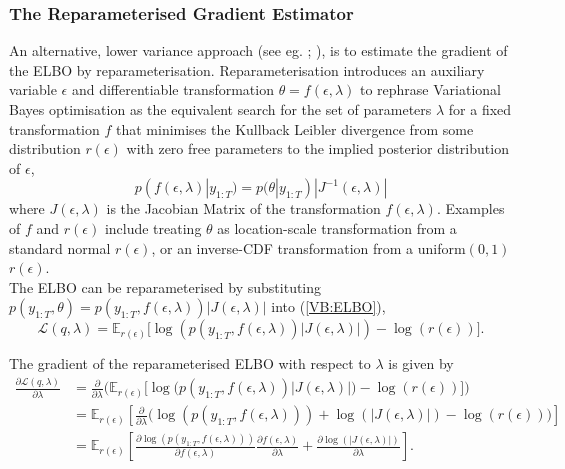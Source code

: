 \documentclass[
12pt, %
onehalfspacing, %
nohyperref, %
headsepline, %
chapterinoneline, %
]{MastersDoctoralThesis} %
\begin{document}
\subsubsection{The Reparameterised Gradient Estimator}
\label{subsubsec:SVBRP}
An alternative, lower variance approach (see eg. \cite{Rezende2014}; \cite{Ruiz2016}), is to estimate the gradient of the ELBO by reparameterisation. Reparameterisation introduces an auxiliary variable $\epsilon$ and differentiable transformation $\theta = f(\epsilon, \lambda)$ to rephrase Variational Bayes optimisation as the equivalent search for the set of parameters $\lambda$ for a fixed transformation $f$ that minimises the Kullback Leibler divergence from some distribution $r(\epsilon)$ with zero free parameters to the implied posterior distribution of $\epsilon$,
\begin{equation}
\label{SVB:rpDist}
p(f(\epsilon, \lambda) | y_{1:T}) = p(\theta | y_{1:T}) |J^{-1}(\epsilon, \lambda)|
\end{equation}
where $J(\epsilon, \lambda)$ is the Jacobian Matrix of the transformation $f(\epsilon, \lambda)$. Examples of $f$ and $r(\epsilon)$ include treating $\theta$ as location-scale transformation from a standard normal $r(\epsilon)$, or an inverse-CDF transformation from a uniform$(0, 1)$ $r(\epsilon)$. 
\\

The ELBO can be reparameterised by substituting $p(y_{1:T}, \theta) = p(y_{1:T}, f(\epsilon, \lambda))|J(\epsilon, \lambda)|$ into (\ref{VB:ELBO}),
\begin{equation}
\label{SVB:rpELBO}
\mathcal{L}(q, \lambda) = \mathbb{E}_{r(\epsilon)} \bigg[\log(p(y_{1:T}, f(\epsilon,\lambda))|J(\epsilon, \lambda)|) - \log(r(\epsilon))\bigg].
\end{equation}

The gradient of the reparameterised ELBO with respect to $\lambda$ is given by 
\begin{align}
\label{SVB:rpELBODeriv}
\frac{\partial\mathcal{L}(q, \lambda)}{\partial \lambda} &= \frac{\partial}{\partial \lambda} \bigg( \mathbb{E}_{r(\epsilon)} \bigg[\log\big(p(y_{1:T}, f(\epsilon,\lambda))|J(\epsilon, \lambda)|\big) - \log(r(\epsilon))\bigg] \bigg) \nonumber \\
&= \mathbb{E}_{r(\epsilon)} \left[ \frac{\partial}{\partial \lambda} \bigg(\log(p(y_{1:T}, f(\epsilon,\lambda))) + \log(|J(\epsilon, \lambda)|) - \log(r(\epsilon)) \bigg)\right] \nonumber \\
&= \mathbb{E}_{r(\epsilon)} \left[ \frac{\partial \log(p(y_{1:T}, f(\epsilon,\lambda)))}{\partial f(\epsilon,\lambda)} \frac{\partial f(\epsilon,\lambda)}{\partial \lambda}  + \frac{\partial \log(|J(\epsilon, \lambda)|)}{\partial \lambda} \right].
\end{align}
\end{document}
